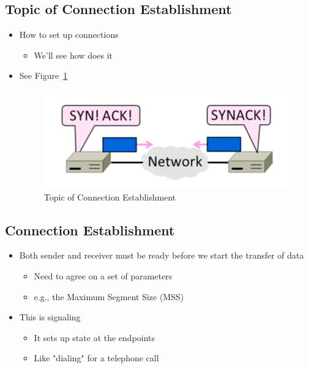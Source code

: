 \documentclass[12pt]{ctexart}   %
\begin{document}
	\subsection{Topic of Connection Establishment}
	\begin{itemize}
		\item How to set up connections
		\begin{itemize}
			\item We'll see how does it
		\end{itemize}
		 \item See Figure~\ref{fig:6-3-1}
		 
		 \begin{figure}[h!] %
		\centering
		 \includegraphics[scale=0.7]{images/6-3-1}
		\caption{ Topic of Connection Establishment }
		 \label{fig:6-3-1}
		 \end{figure}
	\end{itemize}
	
	\subsection{Connection Establishment}
	\begin{itemize}
		\item Both sender and receiver must be ready before we start the transfer of data
		\begin{itemize}
			\item Need to agree on a set of parameters
			\item e.g., the Maximum Segment Size (MSS)
		\end{itemize}
		
		\item This is signaling
		\begin{itemize}
			\item It sets up state at the endpoints
			\item Like "dialing" for a telephone call
		\end{itemize}
	\end{itemize}
	
\end{document}
